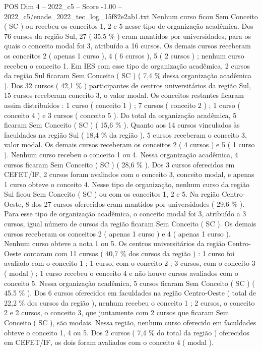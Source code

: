 \begin{textsample}{POS Dim 4 – 2022\_c5 – Score -1.00 – 2022\_c5/enade\_2022\_tec\_log\_15f82e2ab1.txt}
Nenhum curso ficou Sem Conceito ( SC ) ou recebeu os conceitos 1, 2 e 5 nesse tipo de organização acadêmica.
Dos 76 cursos da região Sul, 27 ( 35,5 \% ) eram mantidos por universidades, para os quais o conceito modal foi 3, atribuído a 16 cursos.
Os demais cursos receberam os conceitos 2 ( apenas 1 curso ), 4 ( 6 cursos ), 5 ( 2 cursos ) ; nenhum curso recebeu o conceito 1.
Em IES com esse tipo de organização acadêmica, 2 cursos da região Sul ficaram Sem Conceito ( SC ) ( 7,4 \% dessa organização acadêmica ).
Dos 32 cursos ( 42,1 \% ) participantes de centros universitários da região Sul, 15 cursos receberam conceito 3, o valor modal.
Os conceitos restantes ficaram assim distribuídos : 1 curso ( conceito 1 ) ; 7 cursos ( conceito 2 ) ; 1 curso ( conceito 4 ) e 3 cursos ( conceito 5 ).
Do total da organização acadêmica, 5 ficaram Sem Conceito ( SC ) ( 15,6 \% ).
Quanto aos 14 cursos vinculados às faculdades na região Sul ( 18,4 \% da região ), 5 cursos receberam o conceito 3, valor modal.
Os demais cursos receberam os conceitos 2 ( 4 cursos ) e 5 ( 1 curso ).
Nenhum curso recebeu o conceito 1 ou 4.
Nessa organização acadêmica, 4 cursos ficaram Sem Conceito ( SC ) ( 28,6 \% ).
Dos 3 cursos oferecidos em CEFET/IF, 2 cursos foram avaliados com o conceito 3, conceito modal, e apenas 1 curso obteve o conceito 4.
Nesse tipo de organização, nenhum curso da região Sul ficou Sem Conceito ( SC ) ou com os conceitos 1, 2 e 5.
Na região Centro-Oeste, 8 dos 27 cursos oferecidos eram mantidos por universidades ( 29,6 \% ).
Para esse tipo de organização acadêmica, o conceito modal foi 3, atribuído a 3 cursos, igual número de cursos da região ficaram Sem Conceito ( SC ).
Os demais cursos receberam os conceitos 2 ( apenas 1 curso ) e 4 ( apenas 1 curso ).
Nenhum curso obteve a nota 1 ou 5.
Os centros universitários da região Centro-Oeste contaram com 11 cursos ( 40,7 \% dos cursos da região ) : 1 curso foi avaliado com o conceito 1 ; 1 curso, com o conceito 2 ; 3 cursos, com o conceito 3 ( modal ) ; 1 curso recebeu o conceito 4 e não houve cursos avaliados com o conceito 5.
Nessa organização acadêmica, 5 cursos ficaram Sem Conceito ( SC ) ( 45.5 \% ).
Dos 6 cursos oferecidos em faculdades na região Centro-Oeste ( total de 22,2 \% dos cursos da região ), nenhum recebeu o conceito 1 ; 2 cursos, o conceito 2 e 2 cursos, o conceito 3, que juntamente com 2 cursos que ficaram Sem Conceito ( SC ), são modais.
Nessa região, nenhum curso oferecido em faculdades obteve o conceito 1, 4 ou 5.
Dos 2 cursos ( 7,4 \% do total da região ) oferecidos em CEFET/IF, os dois foram avaliados com o conceito 4 ( modal ).

\end{textsample}
